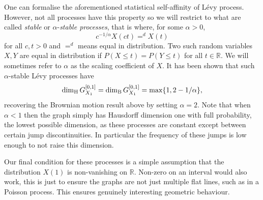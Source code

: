 One can formalise the aforementioned statistical self-affinity of L\'evy process. However, not all processes have this property so we will restrict to what are called \textit{stable} or $\alpha$-\textit{stable processes}, that is where, for some $\alpha > 0$,
\[
c^{-1/\alpha}X(ct) =^d X(t)
\]
for all $c,t > 0$ and $=^d$ means equal in distribution. Two such random variables $X,Y$ are equal in distribution if $P(X \le t) = P(Y \le t)$ for all $t \in \mathbb{R}$.  We will sometimes refer to $\alpha$ as the scaling coefficient of $X$. It has been shown that such $\alpha$-stable L\'evy processes have
\[
\dim_\text{H} G_{X_1}^{[0,1]} = \dim_{\textup{B}}  G_{X_1}^{[0,1]} = \max\{1, 2 - 1/\alpha\},
\]
recovering the Brownian motion result above by setting $\alpha = 2$. Note that when $\alpha < 1$ then the graph simply has Hausdorff dimension one with full probability, the lowest possible dimension, as these processes are constant except between certain jump discontinuities. In particular the frequency of these jumps is low enough to not raise this dimension.

Our final condition for these processes is a simple assumption that the distribution $X(1)$ is non-vanishing on $\mathbb{R}$. Non-zero on an interval would also work, this is just to ensure the graphs are not just multiple flat lines, such as in a Poisson process. This ensures genuinely interesting geometric behaviour.

